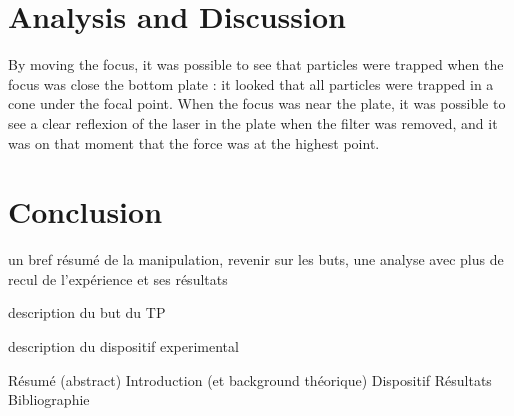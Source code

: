 \documentclass[a4paper,12pt,twoside]{article}	%
\begin{document}
\section{Analysis and Discussion}

By moving the focus, it was possible to see that particles were trapped when the focus was close the bottom plate : it looked that all particles were trapped in a cone under the focal point. When the focus was near the plate, it was possible to see a clear reflexion of the laser in the plate when the filter was removed, and it was on that moment that the force was at the highest point.  





\section{Conclusion}

un bref résumé de la manipulation, revenir sur les buts, une analyse avec plus de recul de l'expérience et ses résultats

description du but du TP

description du dispositif experimental

Résumé (abstract)
Introduction (et background théorique)
Dispositif
Résultats
Bibliographie
\end{document}
